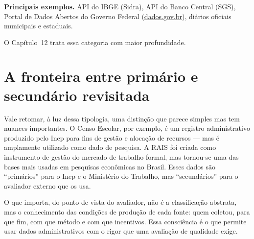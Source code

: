 \textbf{Principais exemplos.} API do IBGE (Sidra), API do Banco Central (SGS), Portal de Dados Abertos do Governo Federal (\url{dados.gov.br}), diários oficiais municipais e estaduais.

O Capítulo~12 trata essa categoria com maior profundidade.

\section{A fronteira entre primário e secundário revisitada}

Vale retomar, à luz dessa tipologia, uma distinção que parece simples mas tem nuances importantes. O Censo Escolar, por exemplo, é um registro administrativo produzido pelo Inep para fins de gestão e alocação de recursos — mas é amplamente utilizado como dado de pesquisa. A RAIS foi criada como instrumento de gestão do mercado de trabalho formal, mas tornou-se uma das bases mais usadas em pesquisas econômicas no Brasil. Esses dados são ``primários'' para o Inep e o Ministério do Trabalho, mas ``secundários'' para o avaliador externo que os usa.

O que importa, do ponto de vista do avaliador, não é a classificação abstrata, mas o conhecimento das condições de produção de cada fonte: quem coletou, para que fim, com que método e com que incentivos. Essa consciência é o que permite usar dados administrativos com o rigor que uma avaliação de qualidade exige.


